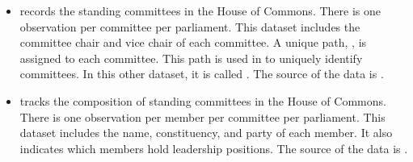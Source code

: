 \begin{itemize}
	\item {} records the standing committees in the House of Commons. There is one observation per committee per parliament. This dataset includes the committee chair and vice chair of each committee. A unique path, , is assigned to each committee. This path is used in  to uniquely identify committees. In this other dataset, it is called . The source of the data is . 
	
	\item {} tracks the composition of standing committees in the House of Commons. There is one observation per member per committee per parliament. This dataset includes the name, constituency, and party of each member. It also indicates which members hold leadership positions. The source of the data is .
	
\end{itemize}

\myline

